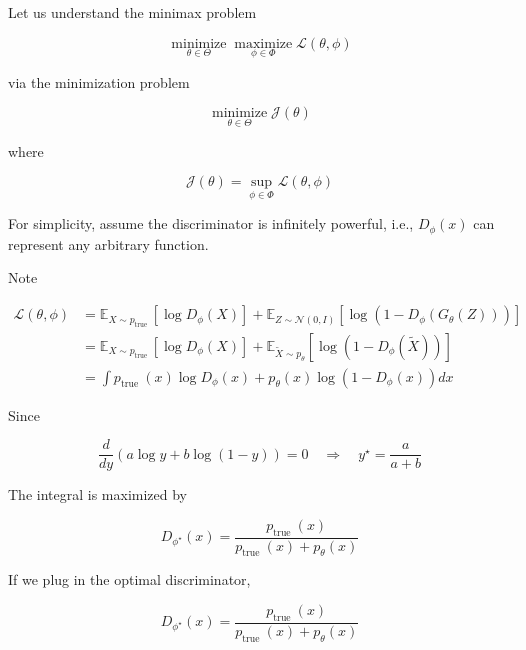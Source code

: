 \begin{concept}
    Let us understand the minimax problem

    $$
    \underset{\theta \in \Theta}{\operatorname{minimize}} \underset{\phi \in \Phi}{\operatorname{maximize}} \mathcal{L}(\theta, \phi)
    $$

    via the minimization problem

    $$
    \underset{\theta \in \Theta}{\operatorname{minimize}} \mathcal{J}(\theta)
    $$

    where

    $$
    \mathcal{J}(\theta)=\sup _{\phi \in \Phi} \mathcal{L}(\theta, \phi)
    $$

    For simplicity, assume the discriminator is infinitely powerful, i.e., $D_{\phi}(x)$ can represent any arbitrary function.

    \par\noindent\textcolor{gray}{\hdashrule{\textwidth}{0.4pt}{1pt 2pt}}

    Note

    $$
    \begin{aligned}
    \mathcal{L}(\theta, \phi) & =\mathbb{E}_{X \sim p_{\text {true }}}\left[\log D_{\phi}(X)\right]+\mathbb{E}_{Z \sim \mathcal{N}(0, I)}\left[\log \left(1-D_{\phi}\left(G_{\theta}(Z)\right)\right)\right] \\
    & =\mathbb{E}_{X \sim p_{\text {true }}}\left[\log D_{\phi}(X)\right]+\mathbb{E}_{\tilde{X} \sim p_{\theta}}\left[\log \left(1-D_{\phi}(\tilde{X})\right)\right] \\
    & =\int p_{\text {true }}(x) \log D_{\phi}(x)+p_{\theta}(x) \log \left(1-D_{\phi}(x)\right) d x
    \end{aligned}
    $$

    Since

    $$
    \frac{d}{d y}(a \log y+b \log (1-y))=0 \quad \Rightarrow \quad y^{\star}=\frac{a}{a+b}
    $$

    The integral is maximized by

    $$
    D_{\phi^{\star}}(x)=\frac{p_{\text {true }}(x)}{p_{\text {true }}(x)+p_{\theta}(x)}
    $$

    \par\noindent\textcolor{gray}{\hdashrule{\textwidth}{0.4pt}{1pt 2pt}}

    If we plug in the optimal discriminator,

    $$
    D_{\phi^{\star}}(x)=\frac{p_{\text {true }}(x)}{p_{\text {true }}(x)+p_{\theta}(x)}
    $$


\end{concept}
